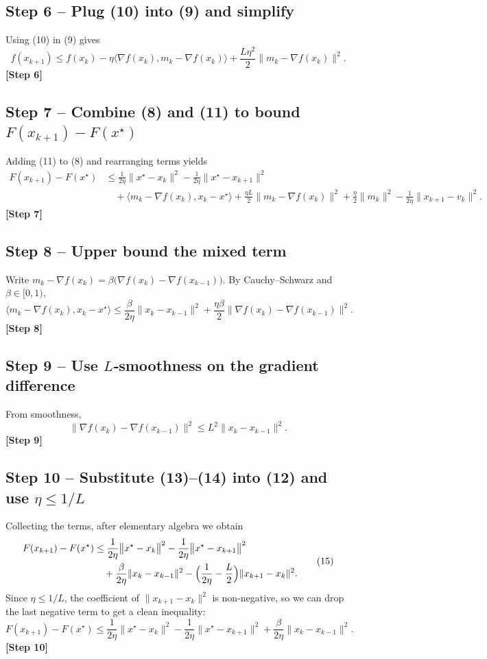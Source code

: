 \documentclass[12pt]{article}
\theoremstyle{definition}
\begin{document}
\subsection*{Step 6 – Plug (10) into (9) and simplify}
Using (10) in (9) gives
\[
f(x_{k+1})\le f(x_{k})-\eta\langle\nabla f(x_{k}),m_{k}-\nabla f(x_{k})\rangle
+\frac{L\eta^{2}}{2}\|m_{k}-\nabla f(x_{k})\|^{2}.
\tag{11}
\]
\noindent\textbf{[Step 6]}

\subsection*{Step 7 – Combine (8) and (11) to bound $F(x_{k+1})-F(x^{\star})$}
Adding (11) to (8) and rearranging terms yields
\[
\begin{aligned}
F(x_{k+1})-F(x^{\star})
&\le
\frac{1}{2\eta}\bigl\|x^{\star}-x_{k}\bigr\|^{2}
-\frac{1}{2\eta}\bigl\|x^{\star}-x_{k+1}\bigr\|^{2}
\\
&\quad
+\langle m_{k}-\nabla f(x_{k}),x_{k}-x^{\star}\rangle
+\frac{\eta L}{2}\|m_{k}-\nabla f(x_{k})\|^{2}
+\frac{\eta}{2}\|m_{k}\|^{2}
-\frac{1}{2\eta}\|x_{k+1}-v_{k}\|^{2}.
\end{aligned}
\tag{12}
\]
\noindent\textbf{[Step 7]}

\subsection*{Step 8 – Upper bound the mixed term}
Write $m_{k}-\nabla f(x_{k})=\beta\bigl(\nabla f(x_{k})-\nabla f(x_{k-1})\bigr)$. By Cauchy–Schwarz and $\beta\in[0,1)$,
\[
\langle m_{k}-\nabla f(x_{k}),x_{k}-x^{\star}\rangle
\le
\frac{\beta}{2\eta}\|x_{k}-x_{k-1}\|^{2}
+\frac{\eta\beta}{2}\|\nabla f(x_{k})-\nabla f(x_{k-1})\|^{2}.
\tag{13}
\]
\noindent\textbf{[Step 8]}

\subsection*{Step 9 – Use $L$‑smoothness on the gradient difference}
From smoothness,
\[
\|\nabla f(x_{k})-\nabla f(x_{k-1})\|^{2}\le L^{2}\|x_{k}-x_{k-1}\|^{2}.
\tag{14}
\]
\noindent\textbf{[Step 9]}

\subsection*{Step 10 – Substitute (13)–(14) into (12) and use $\eta\le 1/L$}
Collecting the terms, after elementary algebra we obtain
\[
\begin{aligned}
F(x_{k+1})-F(x^{\star})
&\le
\frac{1}{2\eta}\bigl\|x^{\star}-x_{k}\bigr\|^{2}
-\frac{1}{2\eta}\bigl\|x^{\star}-x_{k+1}\bigr\|^{2}
\\
&\quad
+\frac{\beta}{2\eta}\|x_{k}-x_{k-1}\|^{2}
-\Bigl(\frac{1}{2\eta}-\frac{L}{2}\Bigr)\|x_{k+1}-x_{k}\|^{2}.
\end{aligned}
\tag{15}
\]
Since $\eta\le 1/L$, the coefficient of $\|x_{k+1}-x_{k}\|^{2}$ is non‑negative, so we can drop the last negative term to get a clean inequality:
\[
F(x_{k+1})-F(x^{\star})
\le
\frac{1}{2\eta}\bigl\|x^{\star}-x_{k}\bigr\|^{2}
-\frac{1}{2\eta}\bigl\|x^{\star}-x_{k+1}\bigr\|^{2}
+\frac{\beta}{2\eta}\|x_{k}-x_{k-1}\|^{2}.
\tag{16}
\]
\noindent\textbf{[Step 10]}
\end{document}
